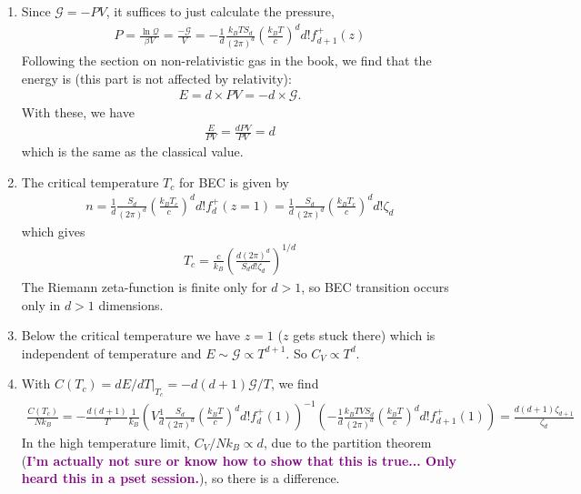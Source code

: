 \documentclass{article}
\theoremstyle{definition}
\newcommand{\be}{\beta}
\newcommand{\f}[2]{\frac{#1}{#2}}
\newcommand{\lp}{\left(}
\newcommand{\rp}{\right)}
\begin{document}
\begin{enumerate}[label=(\alph*)]
	
	
	\item Since $\mathcal{G} = -PV$, it suffices to just calculate the pressure, 
	\begin{align*}
	P = \f{\ln \mathcal{Q}}{\be V} = \f{-\mathcal{G}}{V} = -\f{1}{d}\f{k_B T S_d }{(2\pi)^d}\lp \f{k_B T}{c} \rp^d d! f_{d+1}^+(z)
	\end{align*}
	Following the section on non-relativistic gas in the book, we find that the energy is (this part is not affected by relativity): 
	\begin{align*}
	E = d \times P V = -d\times \mathcal{G}.
	\end{align*}
	With these, we have
	\begin{align*}
	\f{E}{PV} = \f{dP V}{P V} =  \boxed{d}
	\end{align*}
	which is the same as the classical value. 
	
	
	\item The critical temperature $T_c$ for BEC is given by 
	\begin{align*}
	n = \f{1}{d}\f{S_d }{(2\pi)^d}\lp \f{k_B T_c}{c} \rp^d d! f_d^+(z=1) = \f{1}{d}\f{S_d }{(2\pi)^d}\lp \f{k_B T_c}{c} \rp^d d! \zeta_d
	\end{align*}
	which gives
	\begin{align*}
	\boxed{T_c = \f{c}{k_B} \lp \f{d (2\pi)^d}{ S_d d!\zeta_d}  \rp^{1/d}}
	\end{align*}
	The Riemann zeta-function is finite only for $d>1$, so BEC transition occurs only in $\boxed{d>1}$ dimensions. 
	
	
	
	\item Below the critical temperature we have $z=1$ ($z$ gets stuck there) which is independent of temperature and $E\sim \mathcal{G} \propto T^{d+1}$. So $\boxed{C_V \propto T^d}$.
	
	\item With $C(T_c) = dE/dT\vert_{T_c} = -d(d+1)\mathcal{G}/T$, we find
	\begin{align*}
	\f{C(T_c)}{N k_B} = -\f{d(d+1)}{T}\f{1}{k_B} \lp V \f{1}{d}\f{S_d }{(2\pi)^d}\lp \f{k_B T}{c} \rp^d d! f_d^+(1) \rp^{-1}\lp -\f{1}{d}\f{k_B T V S_d }{(2\pi)^d}\lp \f{k_B T}{c} \rp^d d! f_{d+1}^+(1) \rp = \boxed{\f{d(d+1) \zeta_{d+1}}{\zeta_d}}
	\end{align*}
	In the high temperature limit, $C_V/Nk_B \propto d$, due to the partition theorem (\textbf{\textcolor{purple}{I'm actually not sure or know how to show that this is true... Only heard this in a pset session.}}), so there is a difference. 
\end{enumerate}
\end{document}

